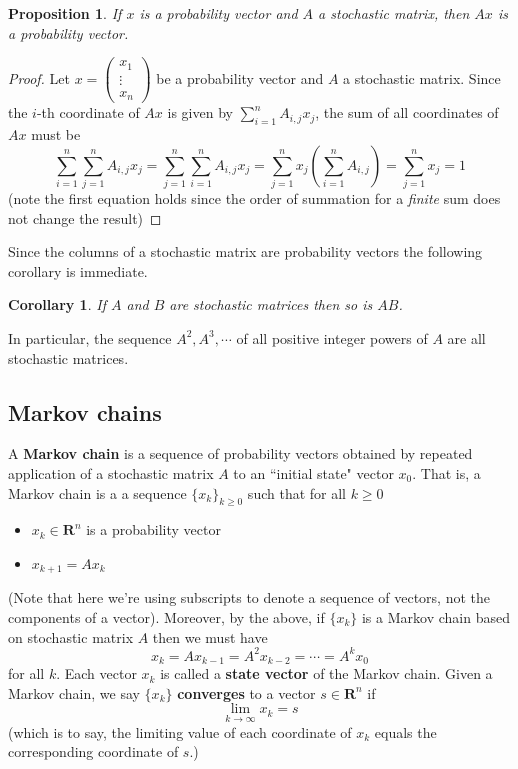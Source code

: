 \documentclass[12pt]{article}
\numberwithin{equation}{subsection}
\numberwithin{figure}{subsection}
\newtheorem{prop}[subsection]{Proposition}
\newtheorem{corr}[subsection]{Corollary}
\theoremstyle{note}
\newcommand{\R}{\mathbf{R}}
\begin{document}
\begin{prop} \label{prop-pv} If $x$ is a probability vector and $A$ a stochastic matrix, then $Ax$ is a probability vector. \end{prop}
\begin{proof}
Let $x=\begin{pmatrix} x_1 \\ \vdots \\ x_n\end{pmatrix}$ be a probability vector and $A$ a stochastic matrix. Since the $i$-th coordinate of $Ax$ is given by $ \sum_{i=1}^n A_{i,j} x_j$, the sum of all coordinates of $Ax$ must be \[ \sum_{i=1}^n \sum_{j=1}^n A_{i,j}x_j = \sum_{j=1}^n \sum_{i=1}^n A_{i,j}x_j=\sum_{j=1}^nx_j \left( \sum_{i=1}^n A_{i,j}\right)=\sum_{j=1}^n x_j=1\] 
(note the first equation holds since the order of summation for a \textit{finite} sum does not change the result)\end{proof}

Since the columns of a stochastic matrix are probability vectors the following corollary is immediate. 
\begin{corr} If $A$ and $B$ are stochastic matrices then so is $AB$. \end{corr}
In particular, the sequence $A^2, A^3,\cdots$ of all positive integer powers of $A$ are all stochastic matrices. 

\subsection{Markov chains} A \textbf{Markov chain} is a sequence of probability vectors obtained by repeated application of a stochastic matrix $A$ to an ``initial state" vector $x_0$. That is, a Markov chain is a a sequence $\{x_k\}_{k\geq 0}$  such that for all $k\geq 0$
\begin{itemize} \item $x_k\in \R^n$ is a probability vector
\item $  x_{k+1}=Ax_{k}$
\end{itemize}
(Note that here we're using subscripts to denote a sequence of vectors, not the components of a vector). Moreover, by the above, if $\{x_k\}$ is a Markov chain based on stochastic matrix $A$ then we must have \[ x_k=Ax_{k-1}=A^2x_{k-2}=\cdots=A^kx_0\] for all $k$. Each vector $x_k$ is called a \textbf{state vector} of the Markov chain. Given a Markov chain, we say $\{x_k\}$ \textbf{converges} to a vector $s\in \R^n$ if  \begin{equation} \lim_{k\to \infty} x_k=s\end{equation} (which is to say, the limiting value of each coordinate of $x_k$ equals the corresponding coordinate of $s$.)
\end{document}

